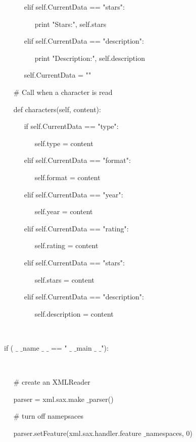 \documentclass{wileySix}
\begin{document}
\begin{myEnumerate}
\begin{myEnumerate}
	\noindent 
	~~~~~ elif self.CurrentData == "stars": \par
	\noindent 
	~~~~~~~~ print "Stars:", self.stars \par
	\noindent 
	~~~~~ elif self.CurrentData == "description": \par
	\noindent 
	~~~~~~~~ print "Description:", self.description \par
	\noindent 
	~~~~~ self.CurrentData = "" \par
	\vspace{12pt}
	\noindent 
	~~  $  \#  $ Call when a character is read \par
	\noindent 
	~~ def characters(self, content): \par
	\noindent 
	~~~~~ if self.CurrentData == "type": \par
	\noindent 
	~~~~~~~~ self.type = content \par
	\noindent 
	~~~~~ elif self.CurrentData == "format": \par
	\noindent 
	~~~~~~~~ self.format = content \par
	\noindent 
	~~~~~ elif self.CurrentData == "year": \par
	\noindent 
	~~~~~~~~ self.year = content \par
	\noindent 
	~~~~~ elif self.CurrentData == "rating": \par
	\noindent 
	~~~~~~~~ self.rating = content \par
	\noindent 
	~~~~~ elif self.CurrentData == "stars": \par
	\noindent 
	~~~~~~~~ self.stars = content \par
	\noindent 
	~~~~~ elif self.CurrentData == "description": \par
	\noindent 
	~~~~~~~~ self.description = content \par
	\noindent 
	~  \par
	\noindent 
	if (  $  \_  $ $  \_  $name $  \_  $ $  \_  $ == " $  \_  $ $  \_  $main $  \_  $ $  \_  $"): \par
	\noindent 
	~~  \par
	\noindent 
	~~  $  \#  $ create an XMLReader \par
	\noindent 
	~~ parser = xml.sax.make $  \_  $parser() \par
	\noindent 
	~~  $  \#  $ turn off namepsaces \par
	\noindent 
	~~ parser.setFeature(xml.sax.handler.feature $  \_  $namespaces, 0) \par
	\vspace{12pt}

\end{myEnumerate}
\end{myEnumerate}
\end{document}
